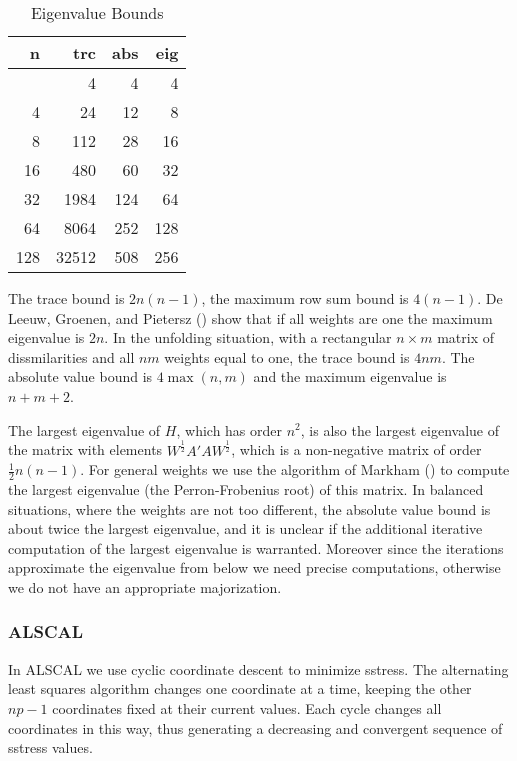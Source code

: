 \documentclass[
  12pt,
  letterpaper,
  DIV=11,
  numbers=noendperiod]{scrartcl}
\begin{document}
\begin{longtable}[]{@{}rrrr@{}}

\caption{\label{tbl-bounds}Eigenvalue Bounds}

\tabularnewline

\toprule\noalign{}
n & trc & abs & eig \\
\midrule\noalign{}
\endhead
\bottomrule\noalign{}
\endlastfoot
2 & 4 & 4 & 4 \\
4 & 24 & 12 & 8 \\
8 & 112 & 28 & 16 \\
16 & 480 & 60 & 32 \\
32 & 1984 & 124 & 64 \\
64 & 8064 & 252 & 128 \\
128 & 32512 & 508 & 256 \\

\end{longtable}

The trace bound is \(2n(n-1)\), the maximum row sum bound is \(4(n-1)\).
De Leeuw, Groenen, and Pietersz
() show that if all
weights are one the maximum eigenvalue is \(2n\). In the unfolding
situation, with a rectangular \(n\times m\) matrix of dissmilarities and
all \(nm\) weights equal to one, the trace bound is \(4nm\). The
absolute value bound is \(4\max(n,m)\) and the maximum eigenvalue is
\(n+m+2\).

The largest eigenvalue of \(H\), which has order \(n^2\), is also the
largest eigenvalue of the matrix with elements
\(W^\frac12A'AW^\frac12\), which is a non-negative matrix of order
\(\frac12n(n-1)\). For general weights we use the algorithm of Markham
() to compute the largest eigenvalue (the
Perron-Frobenius root) of this matrix. In balanced situations, where the
weights are not too different, the absolute value bound is about twice
the largest eigenvalue, and it is unclear if the additional iterative
computation of the largest eigenvalue is warranted. Moreover since the
iterations approximate the eigenvalue from below we need precise
computations, otherwise we do not have an appropriate majorization.

\subsubsection{ALSCAL}\label{alscal}

In ALSCAL we use cyclic coordinate descent to minimize sstress. The
alternating least squares algorithm changes one coordinate at a time,
keeping the other \(np-1\) coordinates fixed at their current values.
Each cycle changes all coordinates in this way, thus generating a
decreasing and convergent sequence of sstress values.
\end{document}
